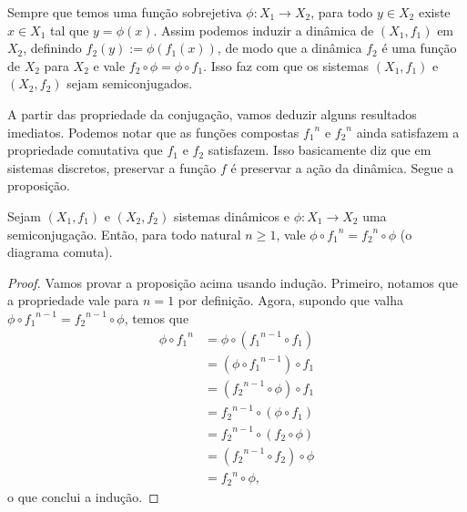 Sempre que temos uma função sobrejetiva $\phi: X_1 \to X_2$, para todo $y \in X_2$ existe $x \in X_1$ tal que $y=\phi(x)$. Assim podemos induzir a dinâmica de $(X_1,f_1)$ em $X_2$, definindo $f_2(y) := \phi(f_1 (x))$, de modo que a dinâmica $f_2$ é uma função de $X_2$ para $X_2$ e vale $f_2 \circ \phi = \phi \circ f_1$. Isso faz com que os sistemas $(X_1,f_1)$ e $(X_2,f_2)$ sejam semiconjugados.

A partir das propriedade da conjugação, vamos deduzir alguns resultados imediatos. Podemos notar que as funções compostas ${f_1}^n$ e ${f_2}^n$ ainda satisfazem a propriedade comutativa que $f_1$ e $f_2$ satisfazem. Isso basicamente diz que em sistemas discretos, preservar a função $f$ é preservar a ação da dinâmica. Segue a proposição.

\begin{proposition}
Sejam $(X_1,f_1)$ e $(X_2,f_2)$ sistemas dinâmicos e $\phi: X_1 \to X_2$ uma semiconjugação. Então, para todo natural $n \geq 1$, vale $\phi \circ {f_1}^n = {f_2}^n \circ \phi$ (o diagrama comuta).

\begin{figure}
\centering
{}
\end{figure}
\end{proposition}
\begin{proof}
Vamos provar a proposição acima usando indução. Primeiro, notamos que a propriedade vale para $n = 1$ por definição. Agora, supondo que valha $\phi \circ {f_1}^{n-1} = {f_2}^{n-1} \circ \phi$, temos que
	\begin{align*}
	\phi \circ {f_1}^n & = \phi \circ ({f_1}^{n-1} \circ {f_1}) \\
						& = (\phi \circ {f_1}^{n-1}) \circ {f_1} \\
						& = ({f_2}^{n-1} \circ \phi) \circ {f_1} \\
						& = {f_2}^{n-1} \circ (\phi \circ {f_1}) \\
						& = {f_2}^{n-1} \circ ({f_2} \circ \phi) \\
						& = ({f_2}^{n-1} \circ {f_2}) \circ \phi \\
						& = {f_2}^n \circ \phi,
	\end{align*}
o que conclui a indução.
	\end{proof}

